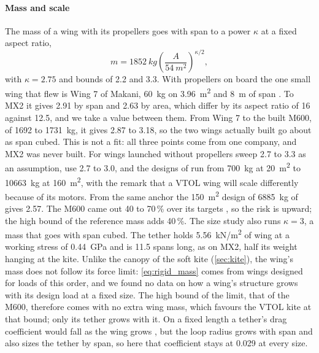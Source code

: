 \paragraph{Mass and scale} The mass of a wing with its propellers goes with span to a power $\kappa$ at a fixed aspect ratio,
\begin{equation}
m = \SI{1852}{kg}\left(\frac{A}{\SI{54}{m^2}}\right)^{\kappa/2},
\label{eq:rigid_mass}
\end{equation}
with $\kappa=2.75$ and bounds of 2.2 and 3.3. With propellers on board the one small wing that flew is Wing 7 of Makani, \SI{60}{kg} on \SI{3.96}{m^2} and \SI{8}{m} of span \citep{vanderlind2013}. To MX2 it gives 2.91 by span and 2.63 by area, which differ by its aspect ratio of 16 against 12.5, and we take a value between them. From Wing 7 to the built M600, of 1692 to \SI{1731}{kg}, it gives 2.87 to 3.18, so the two wings actually built go about as span cubed. This is not a fit: all three points come from one company, and MX2 was never built. For wings launched without propellers \citet{sommerfeld2022scaling} sweep 2.7 to 3.3 as an assumption, \citet{vanhagen2023} use 2.7 to 3.0, and the designs of \citet{joshi2025} run from \SI{700}{kg} at \SI{20}{m^2} to \SI{10663}{kg} at \SI{160}{m^2}, with the remark that a VTOL wing will scale differently because of its motors. From the same anchor the \SI{150}{m^2} design of \SI{6885}{kg} of \citet{eijkelhof2020reference} gives 2.57. The M600 came out 40 to 70\,\% over its targets \citep{echeverri2020part1}, so the risk is upward; the high bound of the reference mass adds 40\,\%. The size study also runs $\kappa=3$, a mass that goes with span cubed. The tether holds \SI{5.56}{kN/m^2} of wing at a working stress of \SI{0.44}{GPa} and is 11.5 spans long, as on MX2, half its weight hanging at the kite. Unlike the canopy of the soft kite (\cref{sec:kite}), the wing's mass does not follow its force limit: \cref{eq:rigid_mass} comes from wings designed for loads of this order, and we found no data on how a wing's structure grows with its design load at a fixed size. The high bound of the limit, that of the M600, therefore comes with no extra wing mass, which favours the VTOL kite at that bound; only its tether grows with it. On a fixed length a tether's drag coefficient would fall as the wing grows \citep{ruiterkamp2013}, but the loop radius grows with span and \citet{vanderlind2013} also sizes the tether by span, so here that coefficient stays at 0.029 at every size.

